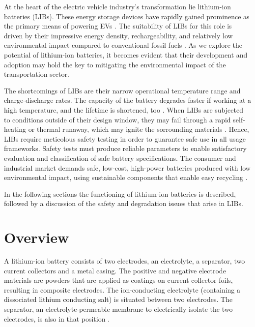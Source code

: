
At the heart of the electric vehicle industry's transformation lie lithium-ion batteries (LIBs). These energy storage devices have rapidly gained prominence as the primary means of powering EVs \cite{zubi2018lithium,stampatori2020li}. The suitability of LIBs for this role is driven by their impressive energy density, rechargeability, and relatively low environmental impact compared to conventional fossil fuels \cite{korthauer2018lithium}. As we explore the potential of lithium-ion batteries, it becomes evident that their development and adoption may hold the key to mitigating the environmental impact of the transportation sector. 

The shortcomings of LIBs are their narrow operational temperature range and charge-discharge rates. The capacity of the battery degrades faster if working at a high temperature, and the lifetime is shortened, too \cite{ma2018temperature,ning2003capacity}. When LIBs are subjected to conditions outside of their design window, they may fail through a rapid self-heating or thermal runaway, which may ignite the sorrounding materials \cite{palacin2016batteries}. 
Hence, LIBs require meticolous safety testing in order to guarantee safe use in all usage frameworks. Safety tests must produce reliable parameters to enable satisfactory evaluation and classification of safe battery specifications. The consumer and industrial market demands safe, low-cost, high-power batteries produced with low environmental impact, using sustainable components that enable easy recycling \cite{doughty2012general}.

In the following sections the functioning of lithium-ion batteries is described, followed by a discussion of the safety and degradation issues that arise in LIBs.

\section{Overview}
\label{sec:overview}
A lithium-ion battery consists of two electrodes, an electrolyte, a separator, two current collectors and a metal casing. The positive and negative electrode materials are powders that are applied as coatings on current collector foils, resulting in composite electrodes. The ion-conducting electrolyte (containing a dissociated lithium conducting salt) is situated between two electrodes. The separator, an electrolyte-permeable membrane to electrically isolate the two electrodes, is also in that position \cite{goodenough2013li}.

